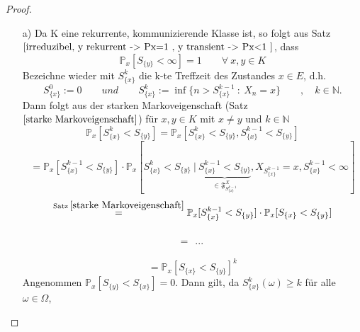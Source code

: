 \documentclass[a4paper,12pt]{scrartcl}
\theoremstyle{definition}
\begin{document}
\begin{proof}
\mbox{}
\begin{itemize}
\item[a)] Da K eine rekurrente, kommunizierende Klasse ist, so folgt aus Satz $\ref{irreduzibel, y rekurrent -> Px=1 , y transient -> Px<1 }$, dass
\begin{equation*}
\mathbb{P}_{x}[S_{\lbrace y \rbrace} < \infty] = 1 \qquad \forall \: x,y \in K
\end{equation*}
Bezeichne wieder mit $S_{\lbrace x \rbrace}^{k}$ die k-te Treffzeit des Zustandes $x \in E$, d.h.
\begin{equation*}
S_{\lbrace x \rbrace}^{0} := 0 \qquad und \qquad S_{\lbrace x \rbrace}^{k} := \inf \lbrace n > S_{\lbrace x \rbrace}^{k-1} \: : \: X_{n} = x \rbrace \qquad , \quad k \in \mathbb{N}.
\end{equation*}
Dann folgt aus der starken Markoveigenschaft (Satz $\ref{starke Markoveigenschaft}$) für $x,y \in K$ mit $x \neq y$ und $k \in \mathbb{N}$
\begin{equation*}
\mathbb{P}_{x}[S_{\lbrace x \rbrace}^{k} < S_{\lbrace y \rbrace}] = \mathbb{P}_{x}[S_{\lbrace x \rbrace}^{k} < S_{\lbrace y \rbrace}, S_{\lbrace x \rbrace}^{k-1} < S_{\lbrace y \rbrace}]
\end{equation*}
\begin{equation*}
= \mathbb{P}_{x}[S_{\lbrace x \rbrace}^{k-1} < S_{\lbrace y \rbrace}]\cdot \mathbb{P}_{x}[S_{\lbrace x \rbrace}^{k} < S_{\lbrace y \rbrace} \: | \: \underbrace{S_{\lbrace x \rbrace}^{k-1} < S_{\lbrace y \rbrace}}_{\in \mathfrak{F}_{S_{\lbrace x \rbrace}^{k-1}}^{X}}, X_{S_{\lbrace x \rbrace}^{k-1}} = x, S_{\lbrace x \rbrace}^{k-1}< \infty]
\end{equation*}
\begin{equation*}
\stackrel{\mathrm{Satz} \: \ref{starke Markoveigenschaft}}{=} \mathbb{P}_{x}[S_{\lbrace x \rbrace}^{k-1} < S_{\lbrace y \rbrace}] \cdot \mathbb{P}_{x}[S_{\lbrace x \rbrace} < S_{\lbrace y \rbrace}]
\end{equation*}
\\
\begin{equation*}
= \: \: ... \: \:
\end{equation*}
\\
\begin{equation*}
= \mathbb{P}_{x}[S_{\lbrace x \rbrace} < S_{\lbrace y \rbrace}]^{k}
\end{equation*}
Angenommen $\mathbb{P}_{x}[S_{\lbrace y \rbrace} < S_{\lbrace x \rbrace}]=0$. Dann gilt, da $S_{\lbrace x \rbrace}^{k}(\omega) \geq k$ für alle $\omega \in \Omega$, 

\end{itemize}
\end{proof}
\end{document}

